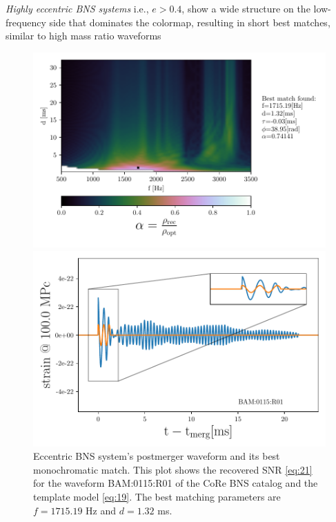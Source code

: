 \FloatBarrier
 

\newpage
\textit{Highly eccentric BNS systems} i.e., $e>0.4$, show a wide structure on the low-frequency side that dominates the colormap, resulting in short best matches, similar to high mass ratio waveforms


\begin{figure}[!htbp]
\begin{center}
\begin{minipage}[t]{0.5\linewidth}
\vspace{0pt}
\includegraphics[scale=0.6,trim={2mm 0 35mm 0},clip]{images/Data_analysis/results/2D_grid_9.pdf}
\end{minipage}%
\begin{minipage}[t]{0.5\linewidth}
\vspace{20pt}
\includegraphics[scale=0.45]{images/Data_analysis/results/2D_grid_10.pdf}
\end{minipage}
\captionsetup{width=0.8\textwidth}
\caption[Eccentric BNS system's postmerger waveform and its best monochromatic match]{Eccentric BNS system's postmerger waveform and its best monochromatic match. This plot shows the recovered SNR \ref{eq:21} for the waveform BAM:0115:R01 of the CoRe BNS catalog \cite{Dietrich:2018phi} and the template model \ref{eq:19}. The best matching parameters are $f=1715.19$ Hz and $d=1.32$ ms.}
\end{center}
\end{figure}

